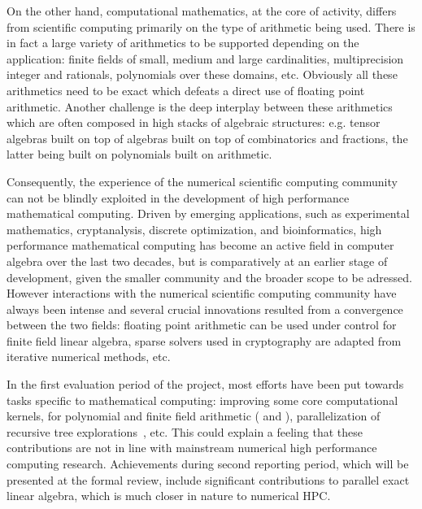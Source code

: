 On the other hand, computational mathematics, at the core of \ODK activity, differs from scientific
computing primarily on the type of arithmetic being used. There is in fact a
large variety of arithmetics to be supported depending on the application: finite
  fields of small, medium and large cardinalities, multiprecision integer and
  rationals, polynomials over these domains, etc. Obviously all these
  arithmetics need to be exact which defeats a direct use of floating point
  arithmetic. Another challenge is the deep interplay between these arithmetics
  which are often composed in high stacks of algebraic structures: e.g. tensor
  algebras built on top of algebras built on top of combinatorics and
  fractions, the latter being built on polynomials built on arithmetic.

Consequently, the experience of the numerical scientific computing community can not
be blindly exploited in the development of high performance mathematical
computing.
Driven by emerging applications, such as experimental mathematics, cryptanalysis,
discrete optimization, and bioinformatics, high performance mathematical computing has
become an active field in computer algebra over the last two decades, but is
comparatively at an earlier stage of development, given the smaller community
and the broader scope to be adressed.
However interactions with the numerical scientific computing community
have always been intense and several crucial innovations
resulted from a convergence between the two fields: floating point arithmetic
can be used under control for finite field linear algebra, sparse solvers used
in cryptography are adapted from iterative numerical methods, etc.

In the first evaluation period of the project, most efforts have been put
towards tasks specific to mathematical computing: improving some core computational kernels, for polynomial and finite
field arithmetic (  and ),
parallelization of recursive tree explorations~, etc. This could explain a
feeling that these contributions are not in line with mainstream numerical high
performance computing research.
Achievements during second reporting period, which will be presented
at the formal review, include significant contributions to parallel
exact linear algebra, which is much closer in nature to numerical HPC.

